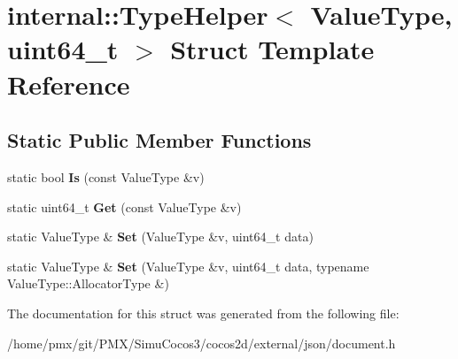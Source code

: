 \hypertarget{structinternal_1_1TypeHelper_3_01ValueType_00_01uint64__t_01_4}{}\section{internal\+:\+:Type\+Helper$<$ Value\+Type, uint64\+\_\+t $>$ Struct Template Reference}
\label{structinternal_1_1TypeHelper_3_01ValueType_00_01uint64__t_01_4}
\subsection*{Static Public Member Functions}
\begin{DoxyCompactItemize}
\item 
\mbox{\label{structinternal_1_1TypeHelper_3_01ValueType_00_01uint64__t_01_4_a4916651732ed27fa944c96a32cec5b88}} 
static bool {\bfseries Is} (const Value\+Type \&v)
\item 
\mbox{\label{structinternal_1_1TypeHelper_3_01ValueType_00_01uint64__t_01_4_a1b1b2e4fe3c38fb37701284c6571ee92}} 
static uint64\+\_\+t {\bfseries Get} (const Value\+Type \&v)
\item 
\mbox{\label{structinternal_1_1TypeHelper_3_01ValueType_00_01uint64__t_01_4_a38392035fe5a647078b24f0e15a84145}} 
static Value\+Type \& {\bfseries Set} (Value\+Type \&v, uint64\+\_\+t data)
\item 
\mbox{\label{structinternal_1_1TypeHelper_3_01ValueType_00_01uint64__t_01_4_a3c8b01c3e9a9e63c99bef2db9fdf3823}} 
static Value\+Type \& {\bfseries Set} (Value\+Type \&v, uint64\+\_\+t data, typename Value\+Type\+::\+Allocator\+Type \&)
\end{DoxyCompactItemize}


The documentation for this struct was generated from the following file\+:\begin{DoxyCompactItemize}
\item 
/home/pmx/git/\+P\+M\+X/\+Simu\+Cocos3/cocos2d/external/json/document.\+h\end{DoxyCompactItemize}

